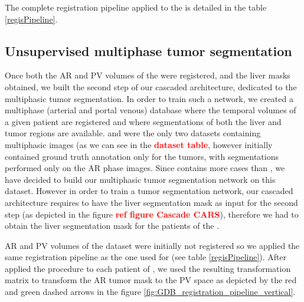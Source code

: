 The complete registration pipeline applied to the  is detailed in the table \ref{regisPipeline}.

\subsection{Unsupervised multiphase tumor
segmentation}\label{tcia-db-unsupervised-multiphase-tumor-segmentation}

Once both the AR and PV volumes of the  were registered, and the
liver masks obtained, we built the second step of our cascaded
architecture, dedicated to the multiphasic tumor segmentation. In order
to train such a network, we created a multiphase (arterial and portal
venous) database where the temporal volumes of a given patient are
registered and where segmentations of both the liver and tumor regions
are available.
 and  were the only two datasets containing multiphasic
images (as we can see in the \textcolor{red}{\textbf{dataset table}}, however
 initially contained ground truth annotation only for the tumors,
with segmentations performed only on the AR phase images.
Since  contains more cases than , we have decided to
build our multiphasic tumor segmentation network on this dataset.
However in order to train a tumor segmentation network, our cascaded
architecture requires to have the liver segmentation mask as input for
the second step (as depicted in the figure \textcolor{red}{\textbf{ref figure
Cascade CARS}}), therefore we had to obtain the liver segmentation
mask for the patients of the .

AR and PV volumes of the  dataset were initially not registered so
we applied the same registration pipeline as the one used for  (see table \ref{regisPipeline}). After applied the procedure to
each patient of , we used the resulting transformation matrix to
transform the AR tumor mask to the PV space as depicted by the red and green dashed arrows in the figure \ref{fig:GDB_registration_pipeline_vertical}.


